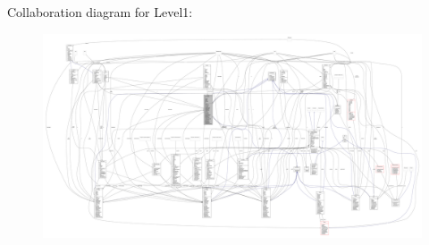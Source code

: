 Collaboration diagram for Level1\+:
\nopagebreak
\begin{figure}[H]
\begin{center}
\leavevmode
\includegraphics[width=350pt]{classscenes_1_1_level1__coll__graph}
\end{center}
\end{figure}
